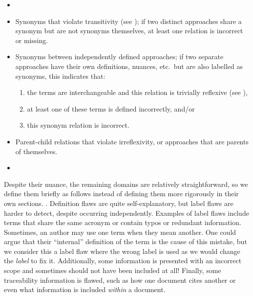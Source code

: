 \begin{itemize}
    \item \multiCatIntro*{}
    \item {}\label{relevantSyns}
          Synonyms that violate transitivity (see ); if two
          distinct approaches share a synonym but are not synonyms themselves,
          at least one relation is incorrect or missing.
    \item Synonyms between independently defined approaches; if two separate
          approaches have their own definitions, nuances, etc.~but are also
          labelled as synonyms, this indicates that:
          \begin{enumerate}
              \item the terms are interchangeable and this relation is
                    trivially reflexive (see ),
              \item at least one of these terms is defined incorrectly, and/or
              \item this synonym relation is incorrect.
          \end{enumerate}
    \item {}\label{selfParDef}
          Parent-child relations that violate irreflexivity, or approaches that
          are parents of themselves.
    \item {}\label{parSynDef}
          \parSynFlaw*{}
\end{itemize}



Despite their nuance, the remaining domains are relatively straightforward, so
we define them briefly as follows instead of defining them more rigorously in
their own sections.\label{label-flaw-def}
. Definition flaws are quite self-explanatory, but
label flaws are harder to detect, despite occurring independently. Examples of
label flaws include terms that share the same acronym or contain typos or
redundant information. Sometimes, an author may use one term when they mean
another. One could argue that their ``internal'' definition of the term is the
cause of this mistake, but we consider this a label flaw where the wrong
label is used as we would change the \emph{label} to fix it.
\label{scope-flaw-def}%
Additionally, some information is presented with an incorrect scope and
sometimes should not have been included at all!
\label{trace-flaw-def}%
Finally, some traceability information is flawed, such as how one document
cites another or even what information is included \emph{within} a document.

